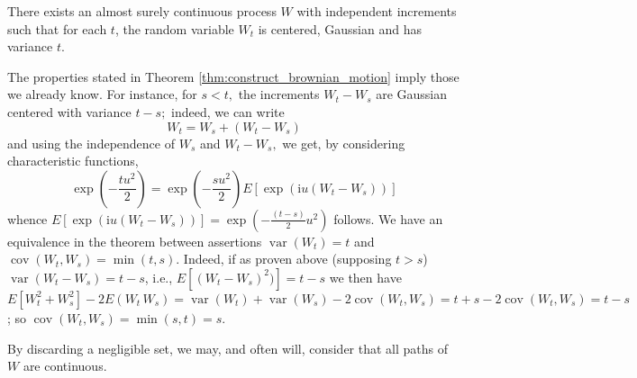 
\begin{theorem}\label{thm:construct_brownian_motion}
	There exists an almost surely continuous process $W$ with independent increments such that for each $t$, the random variable $W_{t}$ is centered, Gaussian and has variance $t$.
\end{theorem}
The properties stated in Theorem \eqref{thm:construct_brownian_motion} imply those we already know. For instance, for $s<t,$ the increments $W_{t}-W_{s}$ are Gaussian centered with variance $t-s ;$ indeed, we can write
\[
W_{t}=W_{s}+\left(W_{t}-W_{s}\right)
\]
and using the independence of $W_{s}$ and $W_{t}-W_{s},$ we get, by considering characteristic functions,
\[
\exp \left(-\frac{t u^{2}}{2}\right)=\exp \left(-\frac{s u^{2}}{2}\right) E\left[\exp \left(\mathrm{i} u\left(W_{t}-W_{s}\right)\right)\right]
\]
whence $E\left[\exp \left(\mathrm{i} u\left(W_{t}-W_{s}\right)\right)\right]=\exp \left(-\frac{(t-s)}{2} u^{2}\right)$ follows.
We have an equivalence in the theorem  between assertions $\operatorname{var}(W_t)=t$ and $\operatorname{cov}(W_t,W_s)=\min(t,s)$. Indeed, if as proven above (supposing $t>s$) $\operatorname{var}(W_t-W_s)=t-s$,  i.e., $E[(W_t-W_s)^2)]=t-s$ we then have $E[W_t^2+W_s^2]-2E(W_t\, W_s)=\operatorname{var}(W_t)+\operatorname{var}(W_s)-2\operatorname{cov}(W_t,W_s)=t+s-2\operatorname{cov}(W_t,W_s)=t-s$; so $\operatorname{cov}(W_t,W_s)=\min(s,t)=s.$

By discarding a negligible set, we may, and often will, consider that all paths of $W$ are continuous.

